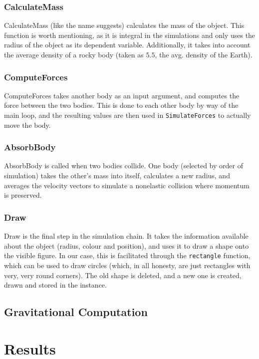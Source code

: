 \documentclass[11pt]{article}
\begin{document}
\subsubsection{CalculateMass}
CalculateMass (like the name suggests) calculates the mass of the object. This function is worth mentioning, as it is integral in the simulations and only uses the radius of the object as its dependent variable. Additionally, it takes into account the average density of a rocky body (taken as $5.5$, the avg. density of the Earth).
\subsubsection{ComputeForces}
ComputeForces takes another body as an input argument, and computes the force between the two bodies. This is done to each other body by way of the main loop, and the resulting values are then used in \verb|SimulateForces| to actually move the body.
\subsubsection{AbsorbBody}
AbsorbBody is called when two bodies collide. One body (selected by order of simulation) takes the other's mass into itself, calculates a new radius, and averages the velocity vectors to simulate a nonelastic collision where momentum is preserved.
\subsubsection{Draw}
Draw is the final step in the simulation chain. It takes the information available about the object (radius, colour and position), and uses it to draw a shape onto the visible figure. In our case, this is facilitated through the \verb|rectangle| function, which can be used to draw circles (which, in all honesty, are just rectangles with very, very round corners). The old shape is deleted, and a new one is created, drawn and stored in the instance.

\subsection{Gravitational Computation}\label{gravityComputeInfo}

\section{Results}
\end{document}
